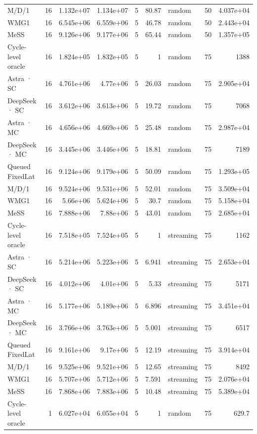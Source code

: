 \begin{tabular}{lrrrrrlrr}
M/D/1 & 16 & 1.132e+07 & 1.134e+07 & 5 & 80.87 & random & 50 & 4.037e+04 \\
WMG1 & 16 & 6.545e+06 & 6.559e+06 & 5 & 46.78 & random & 50 & 2.443e+04 \\
MeSS & 16 & 9.126e+06 & 9.177e+06 & 5 & 65.44 & random & 50 & 1.357e+05 \\
Cycle-level oracle & 16 & 1.824e+05 & 1.832e+05 & 5 & 1 & random & 75 & 1388 \\
Astra · SC & 16 & 4.761e+06 & 4.77e+06 & 5 & 26.03 & random & 75 & 2.905e+04 \\
DeepSeek · SC & 16 & 3.612e+06 & 3.613e+06 & 5 & 19.72 & random & 75 & 7068 \\
Astra · MC & 16 & 4.656e+06 & 4.669e+06 & 5 & 25.48 & random & 75 & 2.987e+04 \\
DeepSeek · MC & 16 & 3.445e+06 & 3.446e+06 & 5 & 18.81 & random & 75 & 7189 \\
Queued FixedLat & 16 & 9.124e+06 & 9.179e+06 & 5 & 50.09 & random & 75 & 1.293e+05 \\
M/D/1 & 16 & 9.524e+06 & 9.531e+06 & 5 & 52.01 & random & 75 & 3.509e+04 \\
WMG1 & 16 & 5.66e+06 & 5.624e+06 & 5 & 30.7 & random & 75 & 5.158e+04 \\
MeSS & 16 & 7.888e+06 & 7.88e+06 & 5 & 43.01 & random & 75 & 2.685e+04 \\
Cycle-level oracle & 16 & 7.518e+05 & 7.524e+05 & 5 & 1 & streaming & 75 & 1162 \\
Astra · SC & 16 & 5.214e+06 & 5.223e+06 & 5 & 6.941 & streaming & 75 & 2.653e+04 \\
DeepSeek · SC & 16 & 4.012e+06 & 4.01e+06 & 5 & 5.33 & streaming & 75 & 5171 \\
Astra · MC & 16 & 5.177e+06 & 5.189e+06 & 5 & 6.896 & streaming & 75 & 3.451e+04 \\
DeepSeek · MC & 16 & 3.766e+06 & 3.763e+06 & 5 & 5.001 & streaming & 75 & 6517 \\
Queued FixedLat & 16 & 9.161e+06 & 9.17e+06 & 5 & 12.19 & streaming & 75 & 3.914e+04 \\
M/D/1 & 16 & 9.525e+06 & 9.521e+06 & 5 & 12.65 & streaming & 75 & 8492 \\
WMG1 & 16 & 5.707e+06 & 5.712e+06 & 5 & 7.591 & streaming & 75 & 2.076e+04 \\
MeSS & 16 & 7.868e+06 & 7.883e+06 & 5 & 10.48 & streaming & 75 & 5.389e+04 \\
Cycle-level oracle & 1 & 6.027e+04 & 6.055e+04 & 5 & 1 & random & 75 & 629.7 \\

\end{tabular}
